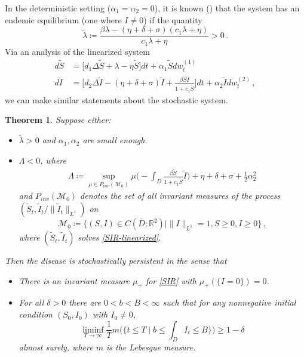 \documentclass[final]{amsart}
\newtheorem{thm}{Theorem}
\numberwithin{thm}{section}
\numberwithin{equation}{section}
\newcommand{\mcM}{\mathcal{M}}
\newcommand{\R}{\mathbb{R}}
\begin{document}
In the deterministic setting ($\alpha_1 = \alpha_2 = 0$), it is known (\cite[Lemma 2.1]{deterministic-SIR}) that the system has an endemic equilibrium (one where $I \neq 0$) if the quantity
\begin{equation}\label{eq:tilde-lambda}
    \tilde \lambda \coloneqq \frac{\beta \lambda - (\eta + \delta + \sigma)(c_1 \lambda + \eta)}{c_1\lambda + \eta} > 0 \,.
\end{equation}
Via an analysis of the linearized system \begin{equation}\label{SIR-linearized}
    \begin{aligned}
        d\tilde S &= \Big[d_1\Delta \tilde S + \lambda - \eta \tilde S\Big]dt + \alpha_1 \tilde Sdw^{(1)}_t \\
        d\tilde I &= \Big[d_2\Delta \tilde I - (\eta + \delta + \sigma) \tilde I + \frac{\beta \tilde S\tilde I}{1 + c_1\tilde S}\Big]dt + \alpha_2 \tilde Idw^{(2)}_t \,,
    \end{aligned}
\end{equation} we can make similar statements about the stochastic system.

\begin{thm}
\label{SIR-thm}
    Suppose either: \begin{itemize}
        \item $\tilde \lambda > 0$ and $\alpha_1, \alpha_2$ are small enough.
        \item $\Lambda < 0$, where 
        \begin{equation}\label{eq:sir-lambda}
             \begin{aligned}
        \Lambda \coloneqq \sup_{\mu \in P_{inv}(\mcM_0)} \mu\Big(-\int_D \frac{\beta \tilde S}{1 + c_1 \tilde S}\tilde I\Big) + \eta + \delta + \sigma + \frac{1}{2}\alpha_2^2
    \end{aligned}
        \end{equation}
 and $P_{inv}(\mcM_0)$ denotes the set of all invariant measures of the process $(\tilde S_t, \tilde I_t / \|\tilde I_t\|_{L^1})$ on
    $$\mcM_0 \coloneqq \{(S,I) \in C(\overline D;\R^2) \mid \|I\|_{L^1} = 1, S \geq 0, I \geq 0\} \,,$$
    where $(\tilde S_t, \tilde I_t)$ solves \eqref{SIR-linearized}.
    \end{itemize} 

    Then the disease is stochastically persistent in the sense that
    \begin{itemize}
        \item There is an invariant measure $\mu_+$ for \eqref{SIR} with $\mu_+(\{I = 0\}) = 0$.
        \item For all $\delta > 0$ there are $0 < b < B < \infty$ such that for any nonnegative initial condition $(S_0,I_0)$ with $I_0 \neq 0$, $$
        \liminf_{T \to \infty} \frac{1}{T}m\Big(\Big\{t \leq T \mid b \leq \int_D I_t \leq B\Big\}\Big) \geq 1 - \delta$$ 
        almost surely, where $m$ is the Lebesgue measure.
    \end{itemize}
\end{thm}
\end{document}
